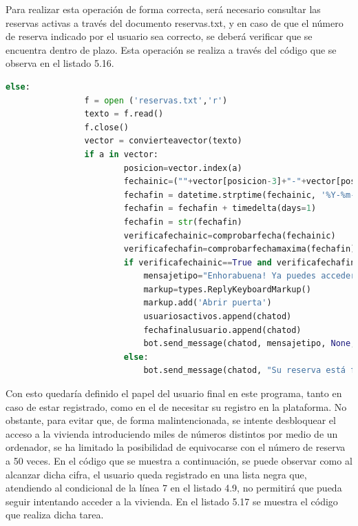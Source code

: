 Para realizar esta operación de forma correcta, será necesario consultar las reservas activas a través del documento reservas.txt, y en caso de que el número de reserva indicado por el usuario sea correcto, se deberá verificar que se encuentra dentro de plazo. Esta operación se realiza a través del código que se observa en el listado 5.16.
\begin{lstlisting}[language=Python,
    caption={Registrar nuevo huesped},
    label=src:registrar-nuevo-huesped
]
            else:
                f = open ('reservas.txt','r')
                texto = f.read()
                f.close()
                vector = convierteavector(texto)
                if a in vector:
                        posicion=vector.index(a)
                        fechainic=(""+vector[posicion-3]+"-"+vector[posicion-2]+"-"+vector[posicion-1])
                        fechafin = datetime.strptime(fechainic, '%Y-%m-%d')
                        fechafin = fechafin + timedelta(days=1)
                        fechafin = str(fechafin)
                        verificafechainic=comprobarfecha(fechainic)
                        verificafechafin=comprobarfechamaxima(fechafin)
                        if verificafechainic==True and verificafechafin==True:                            
                            mensajetipo="Enhorabuena! Ya puedes acceder a tu vivienda pulsando o escribiendo Abrir. Espero que tengas una gran estancia"
                            markup=types.ReplyKeyboardMarkup()
                            markup.add('Abrir puerta')
                            usuariosactivos.append(chatod)
                            fechafinalusuario.append(chatod)
                            bot.send_message(chatod, mensajetipo, None, None, markup)     
                        else:
                            bot.send_message(chatod, "Su reserva está fuera de fecha, recuerda que esta reserva corresponde al periodo del "+fechainic+"a las 12:00 hasta "+fechafin+" a las 15:00")
\end{lstlisting}
Con esto quedaría definido el papel del usuario final en este programa, tanto en caso de estar registrado, como en el de necesitar su registro en la plataforma.
No obstante, para evitar que, de forma malintencionada, se intente desbloquear el acceso a la vivienda introduciendo miles de números distintos por medio de un ordenador, se ha limitado la posibilidad de equivocarse con el número de reserva a 50 veces. En el código que se muestra a continuación, se puede observar como al alcanzar dicha cifra, el usuario queda registrado en una lista negra que, atendiendo al condicional de la línea 7 en el listado 4.9, no permitirá que pueda seguir intentando acceder a la vivienda. En el listado 5.17 se muestra el código que realiza dicha tarea.
